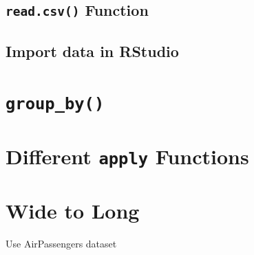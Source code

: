 \documentclass[
  letterpaper,
]{book}
\begin{document}
\subsection{\texorpdfstring{\texttt{read.csv()}
Function}{read.csv() Function}}\label{read.csv-function}

\subsection{Import data in RStudio}\label{import-data-in-rstudio}

\section{\texorpdfstring{\texttt{group\_by()}}{group\_by()}}\label{group_by}

\section{\texorpdfstring{Different \texttt{apply}
Functions}{Different apply Functions}}\label{different-apply-functions}

\section{Wide to Long}\label{wide-to-long}

Use AirPassengers dataset


\backmatter

\end{document}
